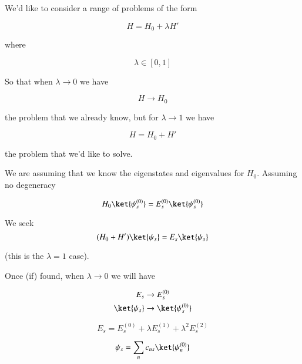 We'd like to consider a range of problems of the form

\begin{equation}\label{eqn:qmTwoL3:330}
H = H_0 + \lambda H'
\end{equation}

where

\begin{equation}\label{eqn:qmTwoL3:350}
\lambda \in [0,1]
\end{equation}

So that when $\lambda \rightarrow 0$ we have

\begin{equation}\label{eqn:qmTwoL3:370}
H \rightarrow H_0
\end{equation}

the problem that we already know, but for $\lambda \rightarrow 1$ we have

\begin{equation}\label{eqn:qmTwoL3:390}
H = H_0 + H'
\end{equation}

the problem that we'd like to solve.

We are assuming that we know the eigenstates and eigenvalues for $H_0$.  Assuming no degeneracy

\begin{equation}\label{eqn:qmTwoL3:410}
H_0 \ket{\psi_s^{(0)}} = 
E_s^{(0)}
\ket{\psi_s^{(0)}} 
\end{equation}

We seek
\begin{equation}\label{eqn:qmTwoL3:430}
(H_0 + H')\ket{\psi_s} = 
E_s
\ket{\psi_s} 
\end{equation}

(this is the $\lambda = 1$ case).

Once (if) found, when $\lambda \rightarrow 0$ we will have

\begin{align*}
E_s &\rightarrow E_s^{(0)} \\
\ket{\psi_s} &\rightarrow \ket{\psi_s^{(0)}}
\end{align*}

\begin{equation}\label{eqn:qmTwoL3:450}
E_s = E_s^{(0)}  + \lambda E_s^{(1)} + \lambda^2 E_s^{(2)}
\end{equation}

\begin{equation}\label{eqn:qmTwoL3:470}
\psi_s = \sum_n c_{ns} \ket{\psi_n^{(0)}}
\end{equation}

